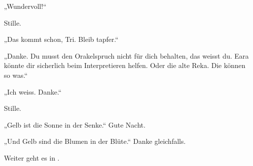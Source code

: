 „Wundervoll!“

Stille.

„Das kommt schon, Tri. Bleib tapfer.“

„Danke. Du musst den Orakelspruch nicht für dich behalten, das weisst du. Eara könnte dir sicherlich beim Interpretieren helfen. Oder die alte Reka. Die können so was.“

„Ich weiss. Danke.“

Stille.

„Gelb ist die Sonne in der Senke.“ Gute Nacht.

„Und Gelb sind die Blumen in der Blüte.“ Danke gleichfalls.

\begin{center}
    Weiter geht es in .
\end{center}

